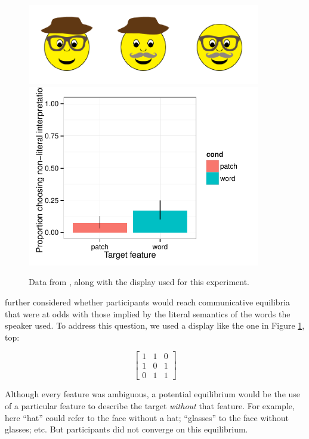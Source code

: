  \begin{figure}[t]
  \centering
  \includegraphics[width=4in]{figures/levels-oddman-stim.pdf}
  \includegraphics[width=4in]{../plots/3-levels-oddman.pdf}

  \caption{\label{fig:levels-oddman} Data from , along with the display used for this experiment.}
\end{figure}


 further considered whether participants would reach communicative equilibria that were at odds with those implied by the literal semantics of the words the speaker used. To address this question, we used a display like the one in Figure \ref{fig:levels-oddman}, top:

\begin{equation}
\left[
    \begin{array}{ccc}
      1 & 1 & 0 \\
      1 & 0 & 1\\
      0 & 1 & 1 
    \end{array} 
  \right]
\end{equation}

\noindent Although every feature was ambiguous, a potential equilibrium would be the use of a particular feature to describe the target \emph{without} that feature. For example, here ``hat'' could refer to the face without a hat; ``glasses'' to the face without glasses; etc. But participants did not converge on this equilibrium. 


